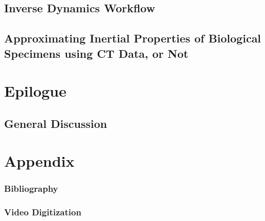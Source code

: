 \documentclass[12pt,a4paper,twoside]{report}
\newcommand\cleartoleftpage{
\ifodd\value{page}\hbox{}\clearpage\else\hbox{}\fi
}
\newcommand\cleartorightpage{
\ifodd\value{page}\hbox{}\clearpage\else\hbox{}\cleardoublepage\fi
\hbox{}
}
\begin{document}
\cleartoleftpage
\chapter{Inverse Dynamics Workflow}\label{cpt:dynamics_workflow}


\cleartoleftpage
\chapter[Inertial Properties]{Approximating Inertial Properties of Biological Specimens using CT Data, or Not}\label{cpt:inertials}




\clearpage
\part{Epilogue}

\cleartoleftpage
\chapter{General Discussion}\label{cpt:generaldiscussion}
\clearpage




\cleartorightpage
\part{Appendix}\label{appendix}

\addtocounter{chapter}{+1}
\setcounter{section}{0}

 \singlespacing
 \section{Bibliography}
 \renewcommand{\bibname}{}
 \makeatletter
 \renewcommand{\chapter}{\@gobbletwo}
 \makeatother
 
 

\clearpage
\section{Video Digitization}\label{cpt:digitization}

\end{document}
